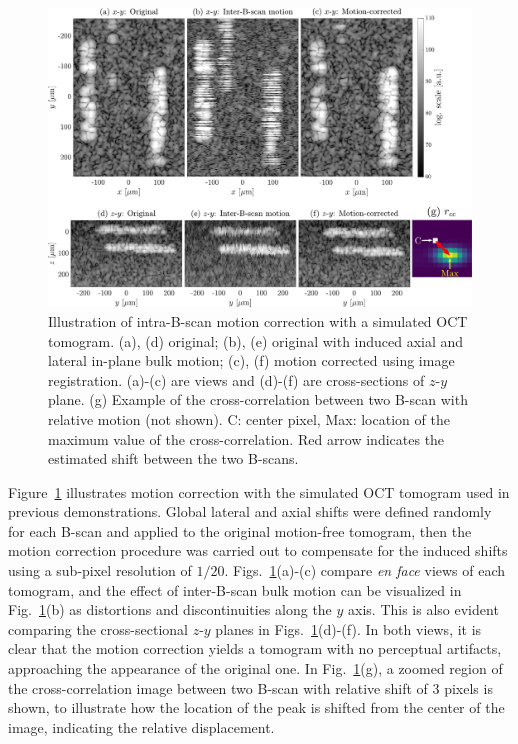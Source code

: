 \begin{figure}[b!]
	\centering
	\includegraphics[width=\textwidth]{Figures/SHARP/MotionCorrection.pdf}
	\caption[Illustration of intra-B-scan motion correction with a simulated OCT tomogram.]{Illustration of intra-B-scan motion correction with a simulated OCT tomogram. (a), (d) original; (b), (e) original with induced axial and lateral in-plane bulk motion; (c), (f) motion corrected using image registration. (a)-(c) are  views and (d)-(f) are cross-sections of $z$-$y$ plane. (g) Example of the cross-correlation between two B-scan with relative motion (not shown). C: center pixel, Max: location of the maximum value of the cross-correlation. Red arrow indicates the estimated shift between the two B-scans.}
	\label{fig:MotionCor}
\end{figure}

Figure~\ref{fig:MotionCor} illustrates motion correction with the simulated OCT tomogram used in previous demonstrations. Global lateral and axial shifts were defined randomly for each B-scan and applied to the original motion-free tomogram, then the motion correction procedure was carried out to compensate for the induced shifts using a sub-pixel resolution of $1/20$. Figs.~\ref{fig:MotionCor}(a)-(c) compare \textit{en face} views of each tomogram, and the effect of inter-B-scan bulk motion can be visualized in Fig.~\ref{fig:MotionCor}(b) as distortions and discontinuities along the $y$ axis. This is also evident comparing the cross-sectional $z$-$y$ planes in Figs.~\ref{fig:MotionCor}(d)-(f). In both views, it is clear that the motion correction yields a tomogram with no perceptual artifacts, approaching the appearance of the original one. In Fig.~\ref{fig:MotionCor}(g), a zoomed region of the cross-correlation image between two B-scan with relative shift of 3 pixels is shown, to illustrate how the location of the peak is shifted from the center of the image, indicating the relative displacement. 

